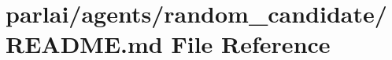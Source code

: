 \hypertarget{parlai_2agents_2random__candidate_2README_8md}{}\section{parlai/agents/random\+\_\+candidate/\+R\+E\+A\+D\+ME.md File Reference}
\label{parlai_2agents_2random__candidate_2README_8md}
